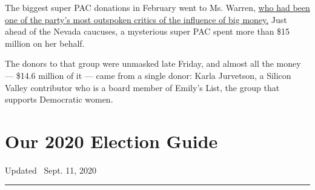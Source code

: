 The biggest super PAC donations in February went to Ms. Warren,
\href{https://www.nytimes3xbfgragh.onion/2020/02/27/us/politics/elizabeth-warren-super-pac.html}{who
had been one of the party's most outspoken critics of the influence of
big money.} Just ahead of the Nevada caucuses, a mysterious super PAC
spent more than \$15 million on her behalf.

The donors to that group were unmasked late Friday, and almost all the
money --- \$14.6 million of it --- came from a single donor: Karla
Jurvetson, a Silicon Valley contributor who is a board member of Emily's
List, the group that supports Democratic women.

\hypertarget{our-2020-election-guide}{%
\section{Our 2020 Election Guide}\label{our-2020-election-guide}}

Updated ~Sept. 11, 2020

\begin{center}\rule{0.5\linewidth}{\linethickness}\end{center}


